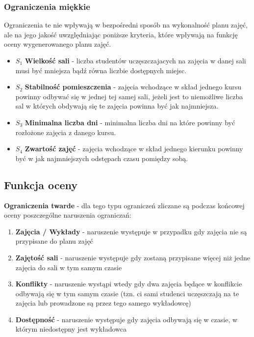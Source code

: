 \documentclass[11pt]{report}
\begin{document}
\subsubsection{Ograniczenia miękkie}
Ograniczenia te nie wpływają w bezpośredni sposób na wykonalność planu zajęć, ale na jego jakość uwzględniając poniższe kryteria, które wpływają na funkcję oceny wygenerowanego planu zajęć.
\begin{itemize}
\item  ${S_{1}}$ \textbf{Wielkość sali} - liczba studentów uczęszczajacych na zajęcia w danej sali musi być mniejsza bądź równa liczbie dostępnych miejsc.
\item  ${S_{2}}$ \textbf{Stabilność pomieszczenia} - zajęcia wchodzące w skład jednego kursu powinny odbywać się w jednej tej samej sali, jeżeli jest to niemożliwe liczba sal w których obdywają się te zajęcia powinna być jak najmniejsza.
\item  ${S_{3}}$ \textbf{Minimalna liczba dni} - minimalna liczba dni na które powinny być rozłożone zajęcia z danego kursu.
\item  ${S_{4}}$ \textbf{Zwartość zajęć} - zajęcia wchodzące w skład jednego kierunku powinny być w jak najmniejszych odstępach czasu pomiędzy sobą.
\end{itemize}
\subsection{Funkcja oceny}
\textbf{Ograniczenia twarde} - dla tego typu ograniczeń zliczane są podczas końcowej oceny poszczególne naruszenia ograniczań:\\
\begin{enumerate}
\item \textbf{Zajęcia / Wykłady} - naruszenie występuje w przypadku gdy zajęcia nie są przypisane do planu zajęć
\item \textbf{Zajętość sali} - naruszenie występuje gdy zostaną przypisane więcej niż jedne zajęcia do sali w tym samym czasie
\item \textbf{Konflikty} - naruszenie wystąpi wtedy gdy dwa zajęcia będące w konflikcie odbywają się w tym samym czasie (tzn. ci sami studenci uczęszczają na te zajęcia lub prowadzone są przez tego samego wykładowcę)
\item \textbf{Dostępność} - naruszenie występuje gdy zajęcia odbywają się w czasie, w którym niedostępny jest wykładowca 
\end{enumerate} 
\end{document}
